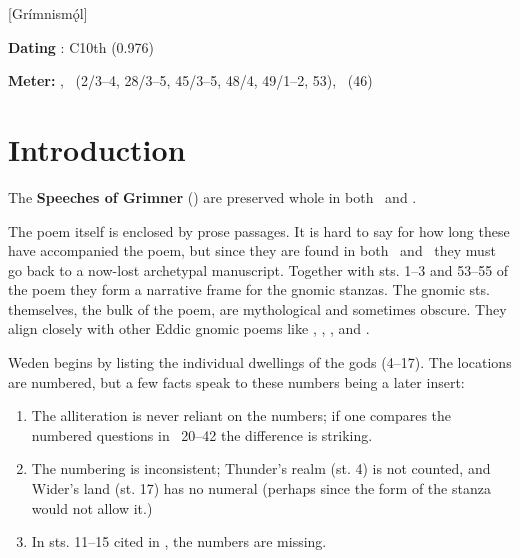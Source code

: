 [Grímnismǫ́l]

\begin{flushright}%
\textbf{Dating} \parencite{Sapp2022}: C10th (0.976)

\textbf{Meter:} \Ljodahattr, \Fornyrdislag\ (2/3–4, 28/3–5, 45/3–5, 48/4, 49/1–2, 53), \Galdralag\ (46)%
\end{flushright}

\section{Introduction}

The \textbf{Speeches of Grimner} (\Grimnismal) are preserved whole in both \Regius\ and \AM.

The poem itself is enclosed by prose passages.  It is hard to say for how long these have accompanied the poem, but since they are found in both \Regius\ and \AM\ they must go back to a now-lost archetypal manuscript.  Together with sts. 1–3 and 53–55 of the poem they form a narrative frame for the gnomic stanzas.  The gnomic sts. themselves, the bulk of the poem, are mythological and sometimes obscure.  They align closely with other Eddic gnomic poems like \Havamal, \Vafthrudnismal, \Sigrdrifumal, and \Allvismal.

Weden begins by listing the individual dwellings of the gods (4–17).  The locations are numbered, but a few facts speak to these numbers being a later insert:

\begin{enumerate}
  \item The alliteration is never reliant on the numbers; if one compares the numbered questions in \Vafthrudnismal\ 20–42 the difference is striking.
  \item The numbering is inconsistent; Thunder’s realm (st. 4) is not counted, and Wider’s land (st. 17) has no numeral (perhaps since the form of the stanza would not allow it.)
  \item In sts. 11–15 cited in \Gylfaginning, the numbers are missing.
\end{enumerate}


